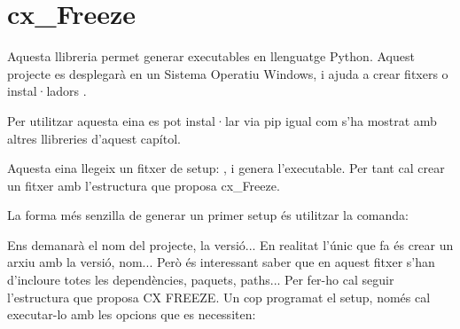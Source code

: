 \documentclass[letterpaper,11pt,catalan]{sphinxmanual}
\begin{document}
\begin{sphinxVerbatim}[commandchars=\\\{\}]
     
\end{sphinxVerbatim}


\section{cx\_Freeze}
\label{\detokenize{index:cx-freeze}}
Aquesta llibreria permet generar executables en llenguatge Python. Aquest projecte es desplegarà
en un Sistema Operatiu Windows, i  ajuda a crear fitxers  o instal·ladors
.

Per utilitzar aquesta eina es pot instal·lar via pip igual com s'ha mostrat amb altres
llibreries d'aquest capítol.

\begin{sphinxVerbatim}[commandchars=\\\{\}]
  
\end{sphinxVerbatim}

Aquesta eina llegeix un fitxer de setup: , i genera l'executable. Per tant
cal crear un fitxer amb l'estructura que proposa cx\_Freeze.

La forma més senzilla de generar un primer setup és utilitzar la comanda:

\begin{sphinxVerbatim}[commandchars=\\\{\}]
\end{sphinxVerbatim}

Ens demanarà el nom del projecte, la versió...
En realitat l'únic que fa és crear un arxiu  amb la versió, nom...
Però és interessant saber que en aquest fitxer s'han d'incloure totes les
dependències, paquets, paths...
Per fer-ho cal seguir l'estructura que proposa CX FREEZE.
Un cop programat el setup, només cal executar-lo amb les opcions que es necessiten:
\end{document}
